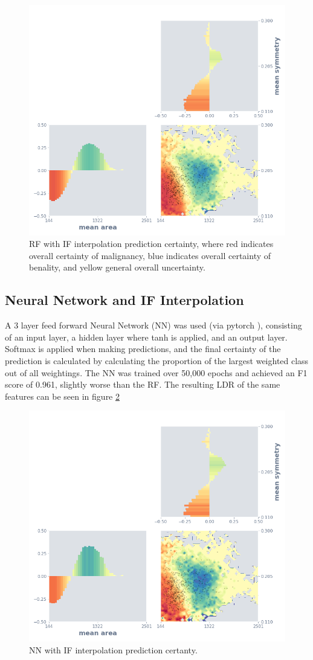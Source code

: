 \documentclass[a4paper, twocolumn]{article}
\begin{document}
\begin{figure}
\centering
\includegraphics[width=0.8\columnwidth]{img/interp_rf_if.png}
\caption{RF with IF interpolation prediction certainty, where red indicates overall certainty of malignancy, blue indicates overall certainty of benality, and yellow general overall uncertainty.}
\label{fig:interp-rf-if}
\end{figure}

\subsection{Neural Network and IF Interpolation}

A 3 layer feed forward Neural Network (NN) was used (via pytorch \cite{paszke2017automatic}), consisting of an input layer, a hidden layer where tanh is applied, and an output layer. Softmax is applied when making predictions, and the final certainty of the prediction is calculated by calculating the proportion of the largest weighted class out of all weightings. The NN was trained over 50,000 epochs and achieved an F1 score of 0.961, slightly worse than the RF. The resulting LDR of the same features can be seen in figure \ref{fig:interp-nn-if}

\begin{figure}
\centering
\includegraphics[width=0.8\columnwidth]{img/interp_nn_if.png}
\caption{NN with IF interpolation prediction certanty.}
\label{fig:interp-nn-if}
\end{figure}
\end{document}
